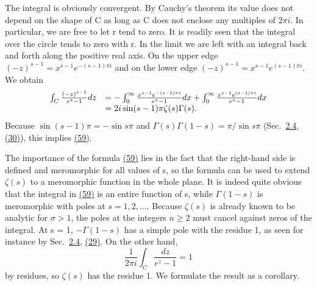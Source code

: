 The integral is obviously convergent. By Cauchy's theorem its value does not depend on the shape of C as long as C does not enclose any multiples of $2\pi i$. In particular, we are free to let r tend to zero. It is readily seen that the integral over the circle tends to zero with r. In the limit we are left with an integral back and forth along the positive real axis. On the upper edge $(-z)^{s-1} = x^{s-1}e^{-(s-1)\pi i}$ and on the lower edge $(-z)^{s-1} = x^{s-1}e^{(s-1)\pi i}$. We obtain
\begin{equation*}
\begin{array}{r l} \int_ {C} \frac {(- z) ^ {s - 1}}{e ^ {z} - 1} d z & = - \int_ {0} ^ {\infty} \frac {x ^ {s - 1} e ^ {- (s - 1) \pi i}}{e ^ {x} - 1} d x + \int_ {0} ^ {\infty} \frac {x ^ {s - 1} e ^ {(s - 1) \pi i}}{e ^ {x} - 1} d x \\ & = 2 i \sin (s - 1) \pi \zeta (s) \Gamma (s). \end{array}
\end{equation*}
Because $\sin (s - 1)\pi = -\sin s\pi$ and $\Gamma (s)\Gamma (1 - s) = \pi /\sin s\pi$ (Sec.~\hyperref[sec:5.2.4]{2.4}, \hyperref[eq:5.30]{(30)}), this implies \hyperref[eq:5.59]{(59)}.

The importance of the formula \hyperref[eq:5.59]{(59)} lies in the fact that the right-hand side is defined and meromorphic for all values of s, so the formula can be used to extend $\zeta(s)$ to a meromorphic function in the whole plane. It is indeed quite obvious that the integral in \hyperref[eq:5.59]{(59)} is an entire function of s, while $\Gamma(1 - s)$ is meromorphic with poles at $s = 1, 2, \ldots$. Because $\zeta(s)$ is already known to be analytic for $\sigma > 1$, the poles at the integers $n \geq 2$ must cancel against zeros of the integral. At s = 1, $-\Gamma(1 - s)$ has a simple pole with the residue 1, as seen for instance by Sec.~\hyperref[sec:5.2.4]{2.4}, \hyperref[eq:5.29]{(29)}. On the other hand,
\begin{equation*}
\frac {1}{2 \pi i} \int_ {C} \frac {d z}{e ^ {z} - 1} = 1
\end{equation*}
by residues, so $\zeta(s)$ has the residue 1. We formulate the result as a corollary.


